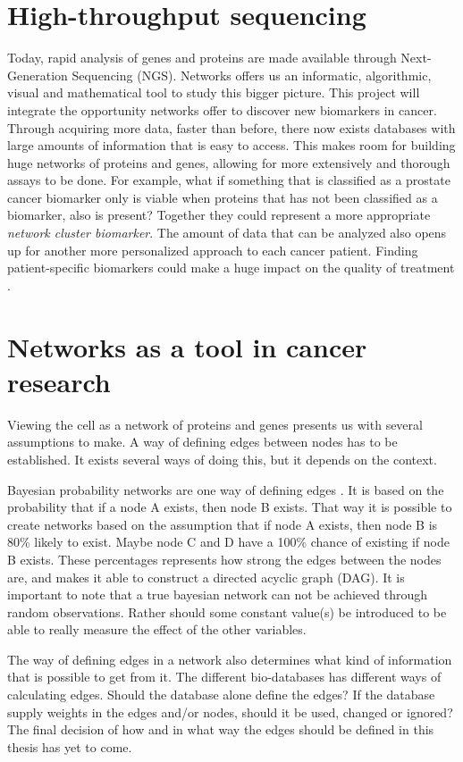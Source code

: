 \section{High-throughput sequencing}
Today, rapid analysis of genes and proteins are made available through
Next-Generation Sequencing (NGS)\cite{ngs1}. Networks offers us an informatic,
algorithmic, visual and mathematical tool to study this bigger picture. This
project will integrate the opportunity networks offer to discover new biomarkers
in cancer. Through acquiring more data, faster than before, there now exists
databases with large amounts of information that is easy to access. This makes
room for building huge networks of proteins and genes, allowing for more
extensively and thorough assays to be done. For example, what if something that
is classified as a prostate cancer biomarker only is viable when proteins that
has not been classified as a biomarker, also is present?  Together they could
represent a more appropriate \emph{network cluster biomarker}. The amount of
data that can be analyzed also opens up for another more personalized approach
to each cancer patient. Finding patient-specific biomarkers could make a huge
impact on the quality of treatment \cite{personalized,personalized2}.  

\section{Networks as a tool in cancer research}
Viewing the cell as a network of proteins and genes presents us with several
assumptions to make. A way of defining edges between nodes has to be
established. It exists several ways of doing this, but it depends on the
context.

Bayesian probability networks are one way of defining edges
\cite{bayesiannetworks}. It is based on the probability that if a node A exists,
then node B exists. That way it is possible to create networks based on the
assumption that if node A exists, then node B is 80\% likely to exist. Maybe
node C and D have a 100\% chance of existing if node B exists.  These
percentages represents how strong the edges between the nodes are, and makes it
able to construct a directed acyclic graph (DAG). It is important to note that a
true bayesian network can not be achieved through random observations. Rather
should some constant value(s) be introduced to be able to really measure the
effect of the other variables.

The way of defining edges in a network also determines what kind of information
that is possible to get from it. The different bio-databases has different ways
of calculating edges. Should the database alone define the edges? If the
database supply weights in the edges and/or nodes, should it be used, changed or
ignored? The final decision of how and in what way the edges should be defined
in this thesis has yet to come. 

